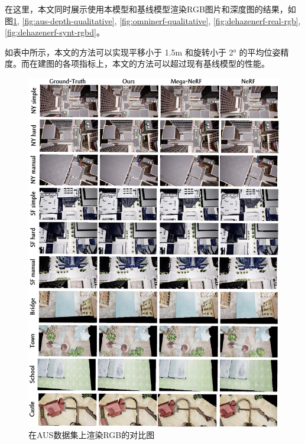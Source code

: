 在这里，本文同时展示使用本模型和基线模型渲染RGB图片和深度图的结果，如图\ref{fig:aus-rgb-qualitative}, \ref{fig:aus-depth-qualitative}, \ref{fig:omninerf-qualitative}, \ref{fig:dehazenerf-real-rgb}, \ref{fig:dehazenerf-synt-rgbd}。

如表中所示，本文的方法可以实现平移小于 1.5m 和旋转小于 2° 的平均位姿精度。而在建图的各项指标上，本文的方法可以超过现有基线模型的性能。


\begin{figure}[p]
    \centering
    \includegraphics[width=\textwidth]{undergraduate-thesis/images/experiments/rgb qualitative.pdf}
    \caption{在AUS数据集上渲染RGB的对比图}
    \label{fig:aus-rgb-qualitative}
\end{figure}


